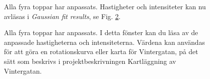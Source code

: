 \documentclass[11pt,swedish,a4paper]{article}
\begin{document}
\begin{figure}[h!]
  \centering
  \caption{Alla fyra toppar har anpassats. Hastigheter och intensiteter
	  kan nu avläsas i \emph{Gaussian fit results}, se Fig. \ref{fig:fitres}.} \label{fig:allfitted}
\end{figure}

\begin{figure}[h!]
  \centering
  \caption{Alla fyra toppar har anpassats. I detta fönster kan du läsa av de anpassade
	  hastigheterna och intensiteterna. Värdena kan användas för att göra en rotationskurva
	  eller karta för Vintergatan, på det sätt som beskrivs i projektbeskrivningen
	  Kartläggning av Vintergatan. 
  } \label{fig:fitres}
\end{figure}
\end{document}

